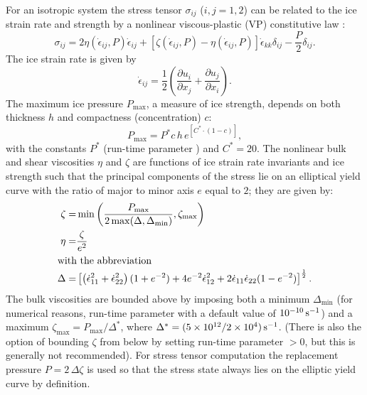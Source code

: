 For an isotropic system the stress tensor $\sigma_{ij}$ ($i,j=1,2$) can
be related to the ice strain rate and strength by a nonlinear
viscous-plastic (VP) constitutive law \citep{hib79, zhang97}:
\begin{equation}
  \label{eq:vpequation}
  \sigma_{ij}=2\eta(\dot{\epsilon}_{ij},P)\dot{\epsilon}_{ij} 
  + \left[\zeta(\dot{\epsilon}_{ij},P) -
    \eta(\dot{\epsilon}_{ij},P)\right]\dot{\epsilon}_{kk}\delta_{ij}  
  - \frac{P}{2}\delta_{ij}.
\end{equation}
The ice strain rate is given by
\begin{equation*}
  \dot{\epsilon}_{ij} = \frac{1}{2}\left( 
    \frac{\partial{u_{i}}}{\partial{x_{j}}} +
    \frac{\partial{u_{j}}}{\partial{x_{i}}}\right).
\end{equation*}
The maximum ice pressure $P_{\max}$, a measure of ice strength, depends on
both thickness $h$ and compactness (concentration) $c$:
\begin{equation}
  P_{\max} = P^{*}c\,h\,e^{[C^{*}\cdot(1-c)]},
\label{eq:icestrength}
\end{equation}
with the constants $P^{*}$ (run-time parameter ) and
$C^{*}=20$. The nonlinear bulk and shear 
viscosities $\eta$ and $\zeta$ are functions of ice strain rate
invariants and ice strength such that the principal components of the
stress lie on an elliptical yield curve with the ratio of major to
minor axis $e$ equal to $2$; they are given by:
\begin{align*}
  \zeta =& \min\left(\frac{P_{\max}}{2\max(\Delta,\Delta_{\min})},
   \zeta_{\max}\right) \\
  \eta =& \frac{\zeta}{e^2} \\
  \intertext{with the abbreviation}
  \Delta = & \left[
    \left(\dot{\epsilon}_{11}^2+\dot{\epsilon}_{22}^2\right)
    (1+e^{-2}) +  4e^{-2}\dot{\epsilon}_{12}^2 + 
    2\dot{\epsilon}_{11}\dot{\epsilon}_{22} (1-e^{-2})
  \right]^{\frac{1}{2}}.
\end{align*}
The bulk viscosities are bounded above by imposing both a minimum
$\Delta_{\min}$ (for numerical reasons, run-time parameter
 with a default value of
$10^{-10}\text{\,s}^{-1}$) and a maximum $\zeta_{\max} =
P_{\max}/\Delta^*$, where
$\Delta^*=(5\times10^{12}/2\times10^4)\text{\,s}^{-1}$. (There is also
the option of bounding $\zeta$ from below by setting run-time
parameter  $>0$, but this is generally not
recommended). For stress tensor computation the replacement pressure $P
= 2\,\Delta\zeta$ \citep{hibler95} is used so that the stress state
always lies on the elliptic yield curve by definition.

